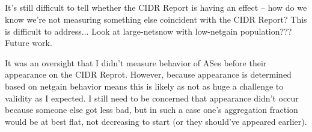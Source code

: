 \subsection{}
It's still difficult to tell whether the CIDR Report is having an effect -- how
do we know we're not measuring something else coincident with the CIDR Report?
This is difficult to address... Look at large-netsnow with low-netgain
population??? Future work.

It was an oversight that I didn't measure behavior of ASes before their
appearance on the CIDR Reprot. However, because appearance is determined based
on netgain behavior means this is likely as not as huge a challenge to validity
as I expected. I still need to be concerned that appearance didn't occur
because someone else got less bad, but in such a case one's aggregation
fraction would be at best flat, not decreasing to start (or they should've
appeared earlier).



%
%
%
%
%
%
%
%
%
